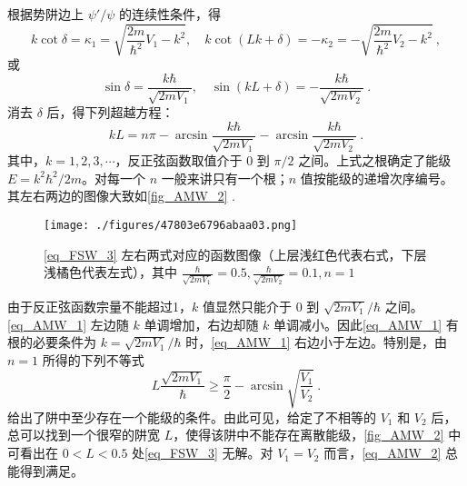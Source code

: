 根据势阱边上 $\psi'/\psi$ 的连续性条件，得
\begin{equation}
k\cot\delta=\kappa_1=\sqrt{\frac{2m}{\hbar^2}V_1-k^2},\quad k\cot(Lk+\delta)=-\kappa_2=-\sqrt{\frac{2m}{\hbar^2}V_2-k^2}~,
\end{equation}
或
\begin{equation}
\sin\delta=\frac{k\hbar}{\sqrt{2mV_1}},\quad\sin(kL+\delta)=-\frac{k\hbar}{\sqrt{2mV_2}}~.
\end{equation}
消去 $\delta$ 后，得下列超越方程：
\begin{equation}\label{eq_AMW_1}
kL=n\pi-\arcsin\frac{k\hbar}{\sqrt{2mV_1}}-\arcsin\frac{k\hbar}{\sqrt{2mV_2}}~.
\end{equation}
其中，$k=1,2,3,\cdots$，反正弦函数取值介于 $0$ 到 $\pi/2$ 之间。上式之根确定了能级 $E=k^2\hbar^2/2m$。对每一个 $n$ 一般来讲只有一个根；$n$ 值按能级的递增次序编号。其左右两边的图像大致如\autoref{fig_AMW_2} .
\begin{figure}[ht]
\centering
\texttt{[image: ./figures/47803e6796abaa03.png]}
\caption{\autoref{eq_FSW_3} 左右两式对应的函数图像（上层浅红色代表右式，下层浅橘色代表左式），其中 $\frac{\hbar}{\sqrt{2mV_1}}=0.5,\frac{\hbar}{\sqrt{2mV_2}}=0.1,n=1$} \label{fig_AMW_2}
\end{figure}
由于反正弦函数宗量不能超过1，$k$ 值显然只能介于 $0$ 到 $\sqrt{2mV_1}/\hbar$ 之间。\autoref{eq_AMW_1} 左边随 $k$ 单调增加，右边却随 $k$ 单调减小。因此\autoref{eq_AMW_1} 有根的必要条件为 $k=\sqrt{2mV_1}/\hbar$ 时，\autoref{eq_AMW_1} 右边小于左边。特别是，由 $n=1$ 所得的下列不等式
\begin{equation}\label{eq_AMW_2}
L\frac{\sqrt{2mV_1}}{\hbar}\geq\frac{\pi}{2}-\arcsin\sqrt{\frac{V_1}{V_2}}~.
\end{equation}
给出了阱中至少存在一个能级的条件。由此可见，给定了不相等的 $V_1$ 和 $V_2$ 后，总可以找到一个很窄的阱宽 $L$，使得该阱中不能存在离散能级，\autoref{fig_AMW_2} 中可看出在 $0<L<0.5$ 处\autoref{eq_FSW_3} 无解。对 $V_1=V_2$ 而言，\autoref{eq_AMW_2} 总能得到满足。